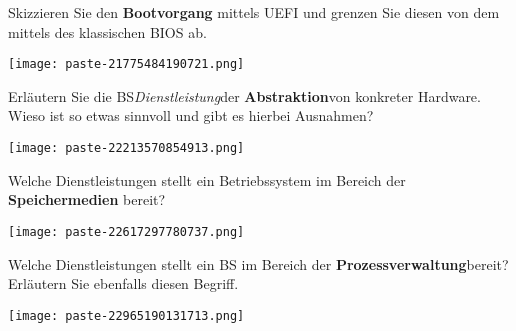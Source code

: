 \documentclass{article}
\begin{document}
\begin{tcolorbox}[colback=white!10!white,colframe=lightgray!75!black,
  savelowerto=\jobname_ex.tex,breakable,enhanced,lines before break=40]

\justifying
Skizzieren Sie den \textbf{Bootvorgang} mittels UEFI und grenzen Sie diesen von dem mittels des klassischen BIOS ab.

\tcblower

\justifying
\begin{center}
\texttt{[image: paste-21775484190721.png]}
\end{center}

\end{tcolorbox}
\begin{tcolorbox}[colback=white!10!white,colframe=lightgray!75!black,
  savelowerto=\jobname_ex.tex,breakable,enhanced,lines before break=40]

\justifying
Erläutern Sie die BS\textit{Dienstleistung}der \textbf{Abstraktion}von konkreter Hardware. Wieso ist so etwas sinnvoll und gibt es hierbei Ausnahmen?

\tcblower

\justifying
\begin{center}
\texttt{[image: paste-22213570854913.png]}
\end{center}

\end{tcolorbox}
\begin{tcolorbox}[colback=white!10!white,colframe=lightgray!75!black,
  savelowerto=\jobname_ex.tex,breakable,enhanced,lines before break=40]

\justifying
Welche Dienstleistungen stellt ein Betriebssystem im Bereich der \textbf{Speichermedien} bereit?

\tcblower

\justifying
\begin{center}
\texttt{[image: paste-22617297780737.png]}
\end{center}

\end{tcolorbox}
\begin{tcolorbox}[colback=white!10!white,colframe=lightgray!75!black,
  savelowerto=\jobname_ex.tex,breakable,enhanced,lines before break=40]

\justifying
Welche Dienstleistungen stellt ein BS im Bereich der \textbf{Prozessverwaltung}bereit? Erläutern Sie ebenfalls diesen Begriff.

\tcblower

\justifying
\begin{center}
\texttt{[image: paste-22965190131713.png]}
\end{center}

\end{tcolorbox}
\end{document}

